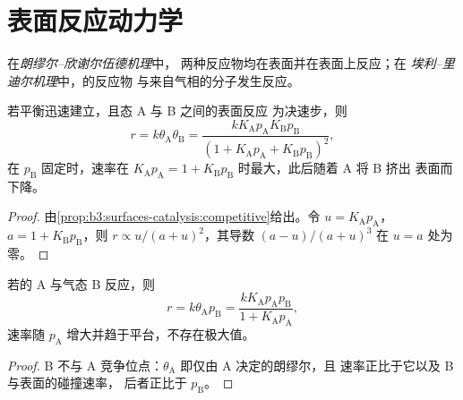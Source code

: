\section{表面反应动力学}

\begin{definition}\label{def:b3:surfaces-catalysis:mechanisms}
在\emph{朗缪尔–欣谢尔伍德机理}中，
两种反应物均在表面并在表面上反应；在
\emph{埃利–里迪尔机理}中，的反应物
与来自气相的分子发生反应。
\end{definition}

\begin{proposition}\label{prop:b3:surfaces-catalysis:lh-rate}
若平衡迅速建立，且态 A 与 B 之间的表面反应
为决速步，则
\[
  r = k\theta_{\mathrm A}\theta_{\mathrm B} = \frac{kK_{\mathrm A}p_{\mathrm A}K_{\mathrm B}p_{\mathrm B}}{(1 + K_{\mathrm A}p_{\mathrm A} + K_{\mathrm B}p_{\mathrm B})^2},
\]
在 $p_{\mathrm B}$ 固定时，速率在 $K_{\mathrm A}p_{\mathrm A} = 1 + K_{\mathrm B}p_{\mathrm B}$ 时最大，此后随着 A 将 B 挤出
表面而下降。
\end{proposition}

\begin{proof}
由\cref{prop:b3:surfaces-catalysis:competitive}给出。令 $u =
K_{\mathrm A}p_{\mathrm A}$，$a = 1 + K_{\mathrm B}p_{\mathrm B}$，则 $r \propto u/(a + u)^2$，其导数 $(a - u)/(a + u)^3$ 在
$u = a$ 处为零。
\end{proof}

\begin{proposition}[埃利–里迪尔速率]\label{prop:b3:surfaces-catalysis:er-rate}
若的 A 与气态 B 反应，则
\[
  r = k\theta_{\mathrm A}p_{\mathrm B} = \frac{kK_{\mathrm A}p_{\mathrm A}p_{\mathrm B}}{1 + K_{\mathrm A}p_{\mathrm A}},
\]
速率随 $p_{\mathrm A}$ 增大并趋于平台，不存在极大值。
\end{proposition}

\begin{proof}
B 不与 A 竞争位点：$\theta_{\mathrm A}$ 即仅由 A 决定的朗缪尔，且
速率正比于它以及 B 与表面的碰撞速率，
后者正比于 $p_{\mathrm B}$。
\end{proof}

